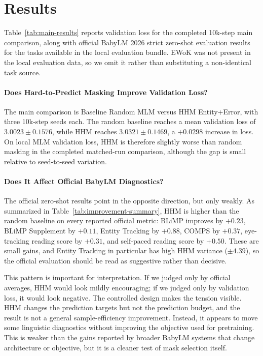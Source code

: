 \section{Results}

Table~\ref{tab:main-results} reports validation loss for the completed 10k-step main comparison, along with official BabyLM 2026 strict zero-shot evaluation results for the tasks available in the local evaluation bundle. EWoK was not present in the local evaluation data, so we omit it rather than substituting a non-identical task source.










\paragraph{Does Hard-to-Predict Masking Improve Validation Loss?}
The main comparison is Baseline Random MLM versus HHM Entity+Error, with three 10k-step seeds each. The random baseline reaches a mean validation loss of $3.0023 \pm 0.1576$, while HHM reaches $3.0321 \pm 0.1469$, a $+0.0298$ increase in loss. On local MLM validation loss, HHM is therefore slightly worse than random masking in the completed matched-run comparison, although the gap is small relative to seed-to-seed variation.

\paragraph{Does It Affect Official BabyLM Diagnostics?}
The official zero-shot results point in the opposite direction, but only weakly. As summarized in Table~\ref{tab:improvement-summary}, HHM is higher than the random baseline on every reported official metric: BLiMP improves by $+0.23$, BLiMP Supplement by $+0.11$, Entity Tracking by $+0.88$, COMPS by $+0.37$, eye-tracking reading score by $+0.31$, and self-paced reading score by $+0.50$. These are small gains, and Entity Tracking in particular has high HHM variance ($\pm 4.39$), so the official evaluation should be read as suggestive rather than decisive.

This pattern is important for interpretation. If we judged only by official averages, HHM would look mildly encouraging; if we judged only by validation loss, it would look negative. The controlled design makes the tension visible. HHM changes the prediction targets but not the prediction budget, and the result is not a general sample-efficiency improvement. Instead, it appears to move some linguistic diagnostics without improving the objective used for pretraining. This is weaker than the gains reported by broader BabyLM systems that change architecture or objective, but it is a cleaner test of mask selection itself.

